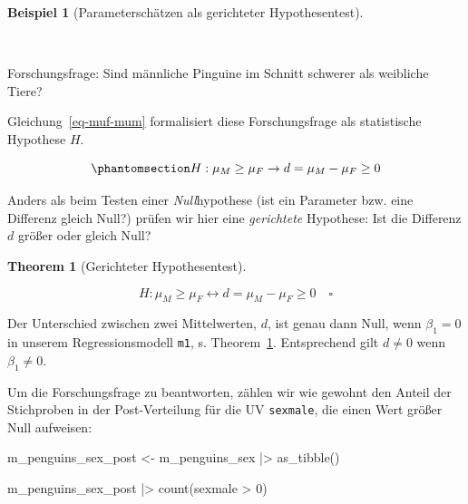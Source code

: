 \documentclass[
  ngerman,
  letterpaper,
  twoside,
  open=any]{scrbook}
\newenvironment{Shaded}{\begin{snugshade}}{\end{snugshade}}
\newcommand{\DecValTok}[1]{\textcolor[rgb]{0.68,0.00,0.00}{#1}}
\newcommand{\FunctionTok}[1]{\textcolor[rgb]{0.28,0.35,0.67}{#1}}
\newcommand{\NormalTok}[1]{\textcolor[rgb]{0.00,0.23,0.31}{#1}}
\newcommand{\OtherTok}[1]{\textcolor[rgb]{0.00,0.23,0.31}{#1}}
\newcommand{\SpecialCharTok}[1]{\textcolor[rgb]{0.37,0.37,0.37}{#1}}
\theoremstyle{definition}
\newtheorem{example}{Beispiel}[chapter]
\theoremstyle{plain}
\newtheorem{theorem}{Theorem}[chapter]
\theoremstyle{definition}
\theoremstyle{definition}
\theoremstyle{definition}
\newtheorem{example}{Beispiel}[chapter]
\theoremstyle{definition}
\theoremstyle{remark}
\begin{document}
\begin{example}[Parameterschätzen als gerichteter
Hypothesentest]\protect\hypertarget{exm-param-hyptest}{}\label{exm-param-hyptest}

~

\begin{displayquote}
Forschungsfrage: Sind männliche Pinguine im Schnitt schwerer als
weibliche Tiere?
\end{displayquote}

Gleichung~\ref{eq-muf-mum} formalisiert diese Forschungsfrage als
statistische Hypothese \(H\).

\begin{equation}\protect\phantomsection\label{eq-muf-mum}{H: \mu_M \ge \mu_F \rightarrow d = \mu_M - \mu_F \ge 0}\end{equation}

\end{example}

Anders als beim Testen einer \emph{Null}hypothese (ist ein Parameter
bzw. eine Differenz gleich Null?) prüfen wir hier eine \emph{gerichtete}
Hypothese: Ist die Differenz \(d\) größer oder gleich Null?

\begin{theorem}[Gerichteter
Hypothesentest]\protect\hypertarget{thm-muf-mum}{}\label{thm-muf-mum}

\[H: \mu_M \ge \mu_F \leftrightarrow d = \mu_M - \mu_F \ge 0\quad \square\]

\end{theorem}

Der Unterschied zwischen zwei Mittelwerten, \(d\), ist genau dann Null,
wenn \(\beta_1 = 0\) in unserem Regressionsmodell \texttt{m1}, s.
Theorem~\ref{thm-muf-mum}. Entsprechend gilt \(d \ne 0\) wenn
\(\beta_1 \ne 0\).

Um die Forschungsfrage zu beantworten, zählen wir wie gewohnt den Anteil
der Stichproben in der Post-Verteilung für die UV \texttt{sexmale}, die
einen Wert größer Null aufweisen:

\begin{Shaded}
\begin{Highlighting}[]
\NormalTok{m\_penguins\_sex\_post }\OtherTok{\textless{}{-}}
\NormalTok{  m\_penguins\_sex }\SpecialCharTok{|\textgreater{}} 
  \FunctionTok{as\_tibble}\NormalTok{()}

\NormalTok{m\_penguins\_sex\_post }\SpecialCharTok{|\textgreater{}} 
  \FunctionTok{count}\NormalTok{(sexmale }\SpecialCharTok{\textgreater{}} \DecValTok{0}\NormalTok{)}
\end{Highlighting}
\end{Shaded}
\end{document}
